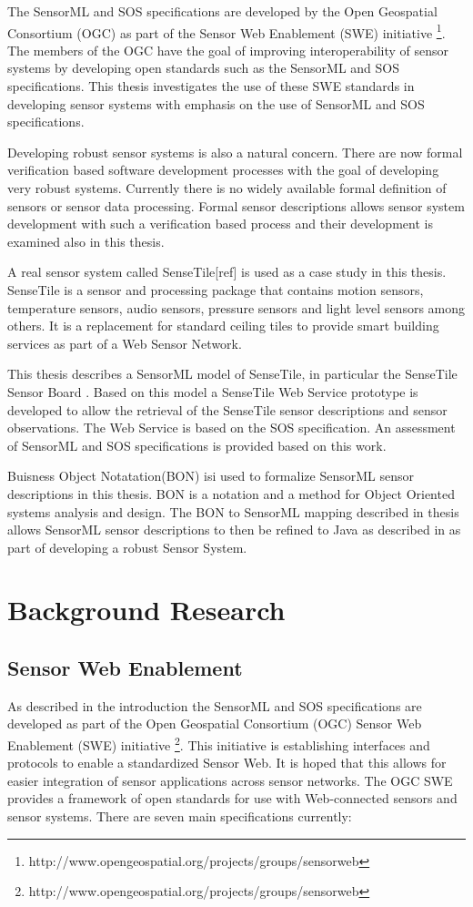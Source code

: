 \documentclass[]{final_report}
\begin{document}
The SensorML and SOS specifications are developed by the Open Geospatial Consortium (OGC) as part of the Sensor Web Enablement (SWE) initiative \footnote{http://www.opengeospatial.org/projects/groups/sensorweb}. The members of the OGC have the goal of improving interoperability of sensor systems by developing open standards such as the SensorML and SOS specifications. This thesis investigates the use of these SWE standards in developing sensor systems with emphasis on the use of SensorML and SOS specifications.

Developing robust sensor systems is also a natural concern. There are now formal verification based software development processes \cite{Kiniryref} with the goal of developing very robust systems.  Currently there is no widely available formal definition of sensors or sensor data processing. Formal sensor descriptions allows sensor system development with such a verification based process and their development is examined also in this thesis.

A real sensor system called SenseTile[ref] is used as a case study in this thesis. SenseTile is a sensor and processing package that contains motion sensors, temperature sensors, audio sensors, pressure sensors and light level sensors among others. It is a replacement for standard ceiling tiles to provide smart building services as part of a Web Sensor Network.

This thesis describes a  SensorML model of SenseTile, in particular the SenseTile Sensor Board . Based on this model a SenseTile Web Service prototype is developed to allow the retrieval of the SenseTile sensor descriptions and sensor observations. The Web Service is based on the SOS specification. An assessment of SensorML and SOS specifications is provided based on this work.

Buisness Object Notatation(BON)\cite{BONref} isi used to formalize SensorML sensor descriptions in this thesis. BON is a notation and a method for Object Oriented systems analysis and design. The BON to SensorML mapping described in thesis allows SensorML sensor descriptions to then be refined to Java as described in \cite{Kiniryref} as part of developing a robust Sensor System.


\chapter{ Background Research}

\section{Sensor Web Enablement}\label{SWESec}
As described in the introduction the SensorML and SOS specifications are developed as part of the Open Geospatial Consortium (OGC) Sensor Web Enablement (SWE) initiative \footnote{http://www.opengeospatial.org/projects/groups/sensorweb}. This initiative is establishing interfaces and protocols to enable a standardized Sensor Web. It is hoped that this allows for easier integration of sensor applications across sensor networks. The OGC SWE provides a framework of open standards for use with Web-connected sensors and sensor systems. There are seven main specifications currently:
\end{document}
